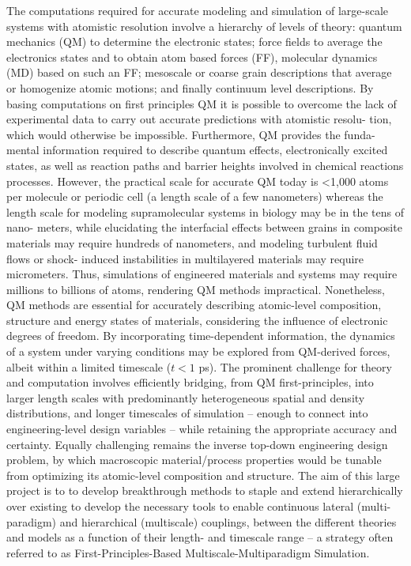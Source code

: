 \documentclass[%
oneside,                 %
final,                   %
10pt]{article}
\begin{document}
The computations required for accurate modeling and simulation of
large-scale systems with atomistic resolution involve a hierarchy of
levels of theory: quantum mechanics (QM) to determine the electronic
states; force fields to average the electronics states and to obtain
atom based forces (FF), molecular dynamics (MD) based on such an FF;
mesoscale or coarse grain descriptions that average or homogenize
atomic motions; and finally continuum level descriptions.  By basing
computations on first principles QM it is possible to overcome the
lack of experimental data to carry out accurate predictions with
atomistic resolu- tion, which would otherwise be
impossible. Furthermore, QM provides the funda- mental information
required to describe quantum effects, electronically excited states,
as well as reaction paths and barrier heights involved in chemical
reactions processes. However, the practical scale for accurate QM
today is <1,000 atoms per molecule or periodic cell (a length scale of
a few nanometers) whereas the length scale for modeling supramolecular
systems in biology may be in the tens of nano- meters, while
elucidating the interfacial effects between grains in composite
materials may require hundreds of nanometers, and modeling turbulent
fluid flows or shock- induced instabilities in multilayered materials
may require micrometers. Thus, simulations of engineered materials and
systems may require millions to billions of atoms, rendering QM
methods impractical.  Nonetheless, QM methods are essential for
accurately describing atomic-level composition, structure and energy
states of materials, considering the influence of electronic degrees
of freedom. By incorporating time-dependent information, the dynamics
of a system under varying conditions may be explored from QM-derived
forces, albeit within a limited timescale ($t <1$ ps). The prominent
challenge for theory and computation involves efficiently bridging,
from QM first-principles, into larger length scales with predominantly
heterogeneous spatial and density distributions, and longer timescales
of simulation – enough to connect into engineering-level design
variables – while retaining the appropriate accuracy and
certainty. Equally challenging remains the inverse top-down
engineering design problem, by which macroscopic material/process
properties would be tunable from optimizing its atomic-level
composition and structure. The aim of this large project is to to
develop breakthrough methods to staple and extend hierarchically over
existing to develop the necessary tools to enable continuous lateral
(multi-paradigm) and hierarchical (multiscale) couplings, between the
different theories and models as a function of their length- and
timescale range – a strategy often referred to as
First-Principles-Based Multiscale-Multiparadigm Simulation.  
\end{document}
